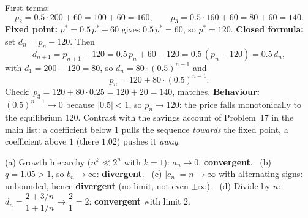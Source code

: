 \begin{solutions}
  \item First terms:
        \[
          p_{2}=0.5\cdot 200+60=100+60=160 ,\qquad
          p_{3}=0.5\cdot 160+60=80+60=140 .
        \]
        \textbf{Fixed point:} $p^{*}=0.5\,p^{*}+60$ gives
        $0.5\,p^{*}=60$, so $p^{*}=120$. \textbf{Closed formula:} set
        $d_{n}=p_{n}-120$. Then
        \[
          d_{n+1}=p_{n+1}-120=0.5\,p_{n}+60-120=0.5\,(p_{n}-120)
                 =0.5\,d_{n} ,
        \]
        with $d_{1}=200-120=80$, so $d_{n}=80\cdot(0.5)^{n-1}$ and
        \[
          p_{n}=120+80\cdot(0.5)^{n-1} .
        \]
        Check: $p_{3}=120+80\cdot 0.25=120+20=140$, matches.
        \textbf{Behaviour:} $(0.5)^{n-1}\to 0$ because $|0.5|<1$, so
        $p_{n}\to 120$: the price falls monotonically to the equilibrium
        $120$. Contrast with the savings account of Problem~17 in the main
        list: a coefficient below $1$ pulls the sequence \emph{towards}
        the fixed point, a coefficient above $1$ (there $1.02$) pushes it
        \emph{away}.

  \item (a) Growth hierarchy ($n^{k}\ll 2^{n}$ with $k=1$):
        $a_{n}\to 0$, \textbf{convergent}. \
        (b) $q=1.05>1$, so $b_{n}\to\infty$: \textbf{divergent}. \
        (c) $|c_{n}|=n\to\infty$ with alternating signs: unbounded, hence
        \textbf{divergent} (no limit, not even $\pm\infty$). \
        (d) Divide by $n$:
        $d_{n}=\dfrac{2+3/n}{1+1/n}\to\dfrac{2}{1}=2$:
        \textbf{convergent} with limit $2$.
\end{solutions}
